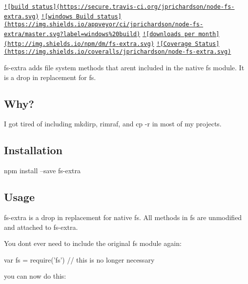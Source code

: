 \href{http://travis-ci.org/jprichardson/node-fs-extra}{\tt !\mbox{[}build status\mbox{]}(https\+://secure.\+travis-\/ci.\+org/jprichardson/node-\/fs-\/extra.\+svg)} \href{https://ci.appveyor.com/project/jprichardson/node-fs-extra/branch/master}{\tt !\mbox{[}windows Build status\mbox{]}(https\+://img.\+shields.\+io/appveyor/ci/jprichardson/node-\/fs-\/extra/master.\+svg?label=windows\%20build)} \href{https://www.npmjs.org/package/fs-extra}{\tt !\mbox{[}downloads per month\mbox{]}(http\+://img.\+shields.\+io/npm/dm/fs-\/extra.\+svg)} \href{https://coveralls.io/r/jprichardson/node-fs-extra}{\tt !\mbox{[}Coverage Status\mbox{]}(https\+://img.\+shields.\+io/coveralls/jprichardson/node-\/fs-\/extra.\+svg)}

{\ttfamily fs-\/extra} adds file system methods that aren\textquotesingle{}t included in the native {\ttfamily fs} module. It is a drop in replacement for {\ttfamily fs}.

\subsection*{Why? }

I got tired of including {\ttfamily mkdirp}, {\ttfamily rimraf}, and {\ttfamily cp -\/r} in most of my projects.

\subsection*{Installation }

\begin{DoxyVerb}npm install --save fs-extra
\end{DoxyVerb}


\subsection*{Usage }

{\ttfamily fs-\/extra} is a drop in replacement for native {\ttfamily fs}. All methods in {\ttfamily fs} are unmodified and attached to {\ttfamily fs-\/extra}.

You don\textquotesingle{}t ever need to include the original {\ttfamily fs} module again\+:


\begin{DoxyCode}
var fs = require(\textcolor{stringliteral}{'fs'}) \textcolor{comment}{// this is no longer necessary}
\end{DoxyCode}


you can now do this\+:


